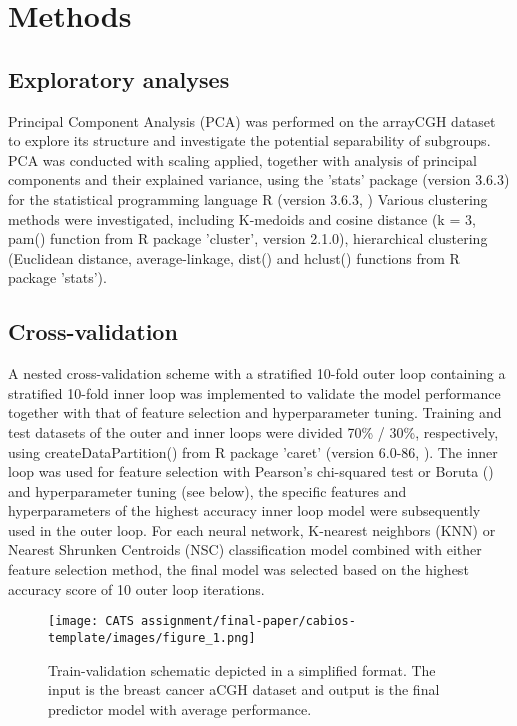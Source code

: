 \section{Methods} \label{Methods}

\subsection{Exploratory analyses}
    Principal Component Analysis (PCA) was performed on the arrayCGH dataset to explore its structure and investigate the potential separability of subgroups. PCA was conducted with scaling applied, together with analysis of principal components and their explained variance, using the 'stats' package (version 3.6.3) for the statistical programming language R (version 3.6.3, \citealp{R2020})
    Various clustering methods were investigated, including K-medoids and cosine distance (k = 3, pam() function from R package 'cluster', version 2.1.0), hierarchical clustering (Euclidean distance, average-linkage, dist() and hclust() functions from R package 'stats').

\subsection{Cross-validation}
    A nested cross-validation scheme with a stratified 10-fold outer loop containing a stratified 10-fold inner loop was implemented to validate the model performance together with that of feature selection and hyperparameter tuning. Training and test datasets of the outer and inner loops were divided 70\% / 30\%, respectively, using createDataPartition() from R package 'caret' (version 6.0-86, \citealp{Kuhn2008}). The inner loop was used for feature selection with Pearson's chi-squared test or Boruta (\citealp{Kursa2010}) and hyperparameter tuning (see below), the specific features and hyperparameters of the highest accuracy inner loop model were subsequently used in the outer loop. For each neural network, K-nearest neighbors (KNN) or Nearest Shrunken Centroids (NSC) classification model combined with either feature selection method, the final model was selected based on the highest accuracy score of 10 outer loop iterations.

    \begin{figure}[]%
        \texttt{[image: CATS assignment/final-paper/cabios-template/images/figure\_1.png]}
        \caption{Train-validation schematic depicted in a simplified format. The input is the breast cancer aCGH dataset and output is the final predictor model with average performance.}\label{fig:01}
    \end{figure}

